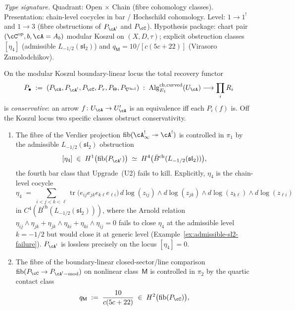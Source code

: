 \begin{theorem}
\label{thm:hdm-koszul-loss-classes}
\emph{Type signature.} Quadrant: Open $\times$ Chain
(fibre cohomology classes). Presentation: chain-level cocycles in
bar / Hochschild cohomology. Level: $1\!\to\!1^!$ and $1\!\to\!3$
(fibre obstructions of $P_{\cA^!}$ and $P_\cC$). Hypothesis package:
chart pair $(\cC^{\mathrm{op}}, b, \cA = A_b)$ modular Koszul on
$(X, D, \tau)$; explicit obstruction classes
$[\eta_4]$ (admissible $L_{-1/2}(\mathfrak{sl}_2)$) and
$q_{\mathsf{M}} = 10/[c(5c+22)]$ (Virasoro Zamolodchikov).

On the modular Koszul boundary-linear locus the total recovery
functor
\[
P_\bullet\;:=\;(P_\cA,P_{\cA^!},P_\cC,P_r,P_\Theta,P_{\nabla^{\mathrm{hol}}})
\;:\;\mathrm{Alg}_{E_1}^{\mathrm{ch,curved}}(U_\cA)\longrightarrow
\prod_{i}R_i
\]
is \emph{conservative}: an arrow $f\colon U_\cA\to U_\cA'$ is an
equivalence iff each $P_i(f)$ is. Off the Koszul locus two specific
classes obstruct conservativity.
\begin{enumerate}[label=\textup{(L\arabic*)}]
\item The fibre of the Verdier projection
$\mathrm{fib}(\cA^!_\infty\twoheadrightarrow\cA^!)$ is
controlled in $\pi_1$ by the admissible
$L_{-1/2}(\mathfrak{sl}_2)$ obstruction
\[
[\eta_4]\;\in\;H^1\bigl(\mathrm{fib}(P_{\cA^!})\bigr)
\;\simeq\;H^4\bigl(\bar B^{\mathrm{ch}}(L_{-1/2}(\mathfrak{sl}_2))\bigr),
\]
the fourth bar class that Upgrade~(U2) fails to kill.
Explicitly, $\eta_4$ is the chain-level cocycle
\[
\eta_4\;=\;
\sum_{i<j<k<\ell}
\operatorname{tr}\bigl(e_{ij}e_{jk}e_{k\ell}e_{\ell i}\bigr)\,
d\log(z_{ij})\wedge d\log(z_{jk})\wedge
d\log(z_{k\ell})\wedge d\log(z_{\ell i})
\]
in $C^4(\bar B^{\mathrm{ch}}(L_{-1/2}(\mathfrak{sl}_2)))$, where the
Arnold relation
$\eta_{ij}\wedge\eta_{jk}+\eta_{jk}\wedge\eta_{ki}+\eta_{ki}\wedge\eta_{ij}=0$
fails to close $\eta_4$ at the admissible level
$k=-1/2$ but would close it at generic level
(Example~\ref{ex:admissible-sl2-failure}).
$P_{\cA^!}$ is lossless precisely on the locus $[\eta_4]=0$.
\item The fibre of the boundary-linear closed-sector/line comparison
$\mathrm{fib}(P_\cC\to P_{\cA^!\mathrm{-mod}})$ on nonlinear
class~$\mathsf M$ is controlled in $\pi_2$ by the quartic contact
class
\[
q_\mathsf{M}\;:=\;\frac{10}{c(5c+22)}\;\in\;
H^2\bigl(\mathrm{fib}(P_\cC)\bigr),
\]
\end{enumerate}
\end{theorem}
